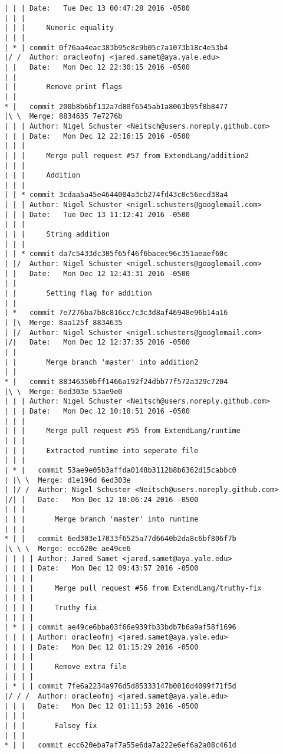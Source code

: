 \begin{lstlisting}
| | | Date:   Tue Dec 13 00:47:28 2016 -0500
| | | 
| | |     Numeric equality
| | |    
| * | commit 0f76aa4eac383b95c8c9b05c7a1073b18c4e53b4
|/ /  Author: oracleofnj <jared.samet@aya.yale.edu>
| |   Date:   Mon Dec 12 22:30:15 2016 -0500
| |   
| |       Remove print flags
| |     
* |   commit 200b8b6bf132a7d80f6545ab1a8063b95f8b8477
|\ \  Merge: 8834635 7e7276b
| | | Author: Nigel Schuster <Neitsch@users.noreply.github.com>
| | | Date:   Mon Dec 12 22:16:15 2016 -0500
| | | 
| | |     Merge pull request #57 from ExtendLang/addition2
| | |     
| | |     Addition
| | |    
| | * commit 3cdaa5a45e4644004a3cb274fd43c0c56ecd38a4
| | | Author: Nigel Schuster <nigel.schusters@googlemail.com>
| | | Date:   Tue Dec 13 11:12:41 2016 -0500
| | | 
| | |     String addition
| | |    
| | * commit da7c5433dc305f65f46f6bacec96c351aeaef60c
| |/  Author: Nigel Schuster <nigel.schusters@googlemail.com>
| |   Date:   Mon Dec 12 12:43:31 2016 -0500
| |   
| |       Setting flag for addition
| |     
| *   commit 7e7276ba7b8c816cc7c3c3d8af46948e96b14a16
| |\  Merge: 8aa125f 8834635
| |/  Author: Nigel Schuster <nigel.schusters@googlemail.com>
|/|   Date:   Mon Dec 12 12:37:35 2016 -0500
| |   
| |       Merge branch 'master' into addition2
| |     
* |   commit 88346350bff1466a192f24dbb77f572a329c7204
|\ \  Merge: 6ed303e 53ae9e0
| | | Author: Nigel Schuster <Neitsch@users.noreply.github.com>
| | | Date:   Mon Dec 12 10:18:51 2016 -0500
| | | 
| | |     Merge pull request #55 from ExtendLang/runtime
| | |     
| | |     Extracted runtime into seperate file
| | |      
| * |   commit 53ae9e05b3affda0148b3112b8b6362d15cabbc0
| |\ \  Merge: d1e196d 6ed303e
| |/ /  Author: Nigel Schuster <Neitsch@users.noreply.github.com>
|/| |   Date:   Mon Dec 12 10:06:24 2016 -0500
| | |   
| | |       Merge branch 'master' into runtime
| | |      
* | |   commit 6ed303e17033f6525a77d6640b2da8c6bf806f7b
|\ \ \  Merge: ecc620e ae49ce6
| | | | Author: Jared Samet <jared.samet@aya.yale.edu>
| | | | Date:   Mon Dec 12 09:43:57 2016 -0500
| | | | 
| | | |     Merge pull request #56 from ExtendLang/truthy-fix
| | | |     
| | | |     Truthy fix
| | | |     
| * | | commit ae49ce6bba03f66e939fb33bdb7b6a9af58f1696
| | | | Author: oracleofnj <jared.samet@aya.yale.edu>
| | | | Date:   Mon Dec 12 01:15:29 2016 -0500
| | | | 
| | | |     Remove extra file
| | | |     
| * | | commit 7fe6a2234a976d5d85333147b0016d4099f71f5d
|/ / /  Author: oracleofnj <jared.samet@aya.yale.edu>
| | |   Date:   Mon Dec 12 01:11:53 2016 -0500
| | |   
| | |       Falsey fix
| | |      
* | |   commit ecc620eba7af7a55e6da7a222e6ef6a2a08c461d

\end{lstlisting}
